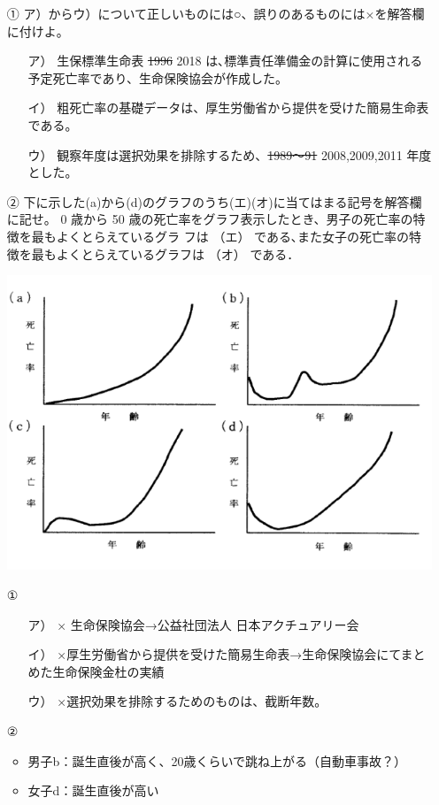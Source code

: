 \documentclass[report,gutter=10mm,fore-edge=10mm,uplatex,dvipdfmx]{jlreq}
\begin{document}
\begin{itemize}
\tightlist
 \item [①]  ア）からウ）について正しいものには○、誤りのあるものには×を解答欄に付けよ。
\begin{itemize}
\tightlist
 \item [ ア）]生保標準生命表 \sout{1996} 2018 は､標準責任準備金の計算に使用される予定死亡率であり、生命保険協会が作成した。
 \item [ イ）]粗死亡率の基礎データは、厚生労働省から提供を受けた簡易生命表である。
 \item [ ウ）]観察年度は選択効果を排除するため、\sout{1989～91} 2008,2009,2011 年度とした。
\end{itemize}
 \item [②] 下に示した(a)から(d)のグラフのうち(エ)(オ)に当てはまる記号を解答欄に記せ。
 0 歳から 50 歳の死亡率をグラフ表示したとき、男子の死亡率の特徴を最もよくとらえているグラ
 フは （エ） である､また女子の死亡率の特徴を最もよくとらえているグラフは （オ） である．

       \includegraphics[scale=0.25]{images/probH161-1-3.png}

\end{itemize}



\begin{itemize}
\tightlist
 \item [①]
\begin{itemize}
\tightlist
 \item [ア）] × 生命保険協会→公益社団法人 日本アクチュアリー会
 \item [イ）]×厚生労働省から提供を受けた簡易生命表→生命保険協会にてまとめた生命保険金杜の実績
 \item [ウ）]×選択効果を排除するためのものは、截断年数。
\end{itemize}
 \item [②]
\begin{itemize}
\tightlist
 \item 男子b：誕生直後が高く、20歳くらいで跳ね上がる（自動車事故？）
 \item  女子d：誕生直後が高い
\end{itemize}
\end{itemize}
\end{document}

